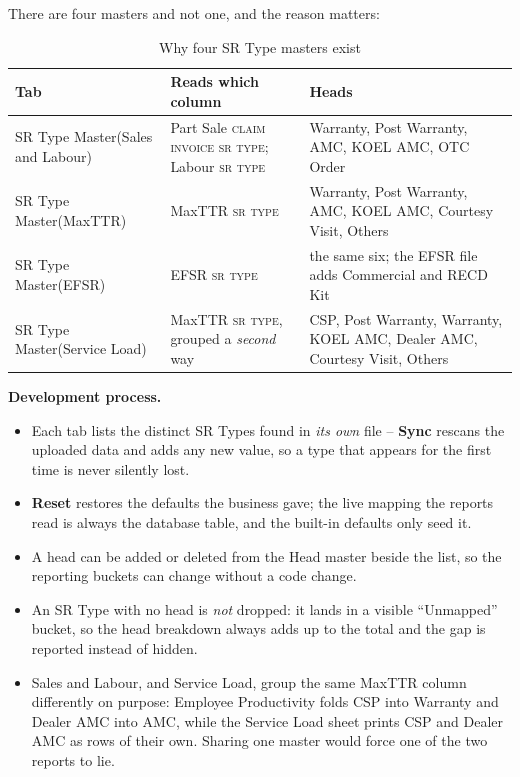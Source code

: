 \documentclass[11pt,a4paper]{article}
\newcommand{\devproc}{\textbf{Development process.}\par}
\newcommand{\qt}[1]{\textquotedblleft #1\textquotedblright}
\newcommand{\col}[1]{\textsc{\small #1}}
\begin{document}
There are four masters and not one, and the reason matters:

\begin{table}[H]\centering\small
\begin{tabularx}{\linewidth}{@{}p{3.6cm}p{3.5cm}X@{}}
\toprule
\textbf{Tab} & \textbf{Reads which column} & \textbf{Heads} \\
\midrule
SR Type Master\newline (Sales and Labour) &
Part Sale \col{claim invoice sr type}; Labour \col{sr type} &
Warranty, Post Warranty, AMC, KOEL AMC, OTC Order \\
\addlinespace
SR Type Master\newline (MaxTTR) &
MaxTTR \col{sr type} &
Warranty, Post Warranty, AMC, KOEL AMC, Courtesy Visit, Others \\
\addlinespace
SR Type Master\newline (EFSR) &
EFSR \col{sr type} &
the same six; the EFSR file adds Commercial and RECD Kit \\
\addlinespace
SR Type Master\newline (Service Load) &
MaxTTR \col{sr type}, grouped a \emph{second} way &
CSP, Post Warranty, Warranty, KOEL AMC, Dealer AMC, Courtesy Visit, Others \\
\bottomrule
\end{tabularx}
\caption{Why four SR Type masters exist}
\end{table}

\devproc
\begin{itemize}
  \item Each tab lists the distinct SR Types found in \emph{its own} file --
  \textbf{Sync} rescans the uploaded data and adds any new value, so a type that appears
  for the first time is never silently lost.
  \item \textbf{Reset} restores the defaults the business gave; the live mapping the
  reports read is always the database table, and the built-in defaults only seed it.
  \item A head can be added or deleted from the Head master beside the list, so the
  reporting buckets can change without a code change.
  \item An SR Type with no head is \emph{not} dropped: it lands in a visible
  \qt{Unmapped} bucket, so the head breakdown always adds up to the total and the gap is
  reported instead of hidden.
  \item Sales and Labour, and Service Load, group the same MaxTTR column differently on
  purpose: Employee Productivity folds CSP into Warranty and Dealer AMC into AMC, while
  the Service Load sheet prints CSP and Dealer AMC as rows of their own. Sharing one
  master would force one of the two reports to lie.
\end{itemize}
\end{document}
